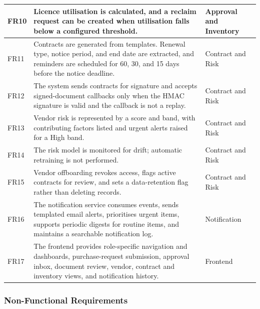 \documentclass[12pt,a4paper]{report}
\begin{document}
\begin{longtable}{|p{0.8in}|p{3.8in}|p{1.5in}|}
\hline
FR10 & Licence utilisation is calculated, and a reclaim request can be
created when utilisation falls below a configured threshold.
& Approval and Inventory \\
\hline
FR11 & Contracts are generated from templates. Renewal type, notice
period, and end date are extracted, and reminders are scheduled for
60, 30, and 15 days before the notice deadline. & Contract and Risk \\
\hline
FR12 & The system sends contracts for signature and accepts signed-document
callbacks only when the HMAC signature is valid and the callback is not
a replay. & Contract and Risk \\
\hline
FR13 & Vendor risk is represented by a score and band, with contributing
factors listed and urgent alerts raised for a High band.
& Contract and Risk \\
\hline
FR14 & The risk model is monitored for drift; automatic retraining is
not performed. & Contract and Risk \\
\hline
FR15 & Vendor offboarding revokes access, flags active contracts for
review, and sets a data-retention flag rather than deleting records.
& Contract and Risk \\
\hline
FR16 & The notification service consumes events, sends templated email
alerts, prioritises urgent items, supports periodic digests for routine
items, and maintains a searchable notification log. & Notification \\
\hline
FR17 & The frontend provides role-specific navigation and dashboards,
purchase-request submission, approval inbox, document review, vendor,
contract and inventory views, and notification history. & Frontend \\
\hline
\end{longtable}

\subsubsection{Non-Functional Requirements}
\end{document}
